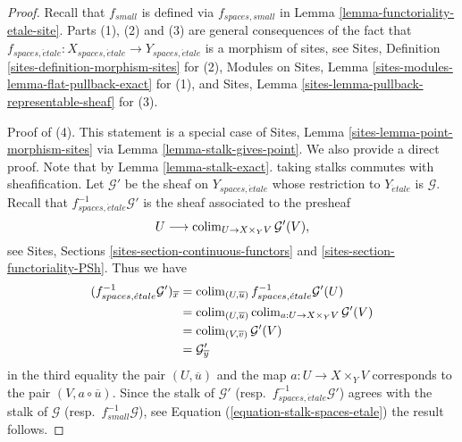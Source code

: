 \begin{proof}
Recall that $f_{small}$ is defined via $f_{spaces, small}$ in
Lemma \ref{lemma-functoriality-etale-site}.
Parts (1), (2) and (3) are general consequences of the fact that
$f_{spaces, \acute{e}tale} :
X_{spaces, \acute{e}tale}
\to
Y_{spaces, \acute{e}tale}$
is a morphism of sites, see
Sites, Definition \ref{sites-definition-morphism-sites}
for (2),
Modules on Sites, Lemma \ref{sites-modules-lemma-flat-pullback-exact}
for (1), and
Sites, Lemma \ref{sites-lemma-pullback-representable-sheaf}
for (3).

\medskip\noindent
Proof of (4). This statement is a special case of
Sites, Lemma \ref{sites-lemma-point-morphism-sites}
via
Lemma \ref{lemma-stalk-gives-point}.
We also provide a direct proof. Note that by
Lemma \ref{lemma-stalk-exact}.
taking stalks commutes with sheafification.
Let $\mathcal{G}'$ be the sheaf on $Y_{spaces, \acute{e}tale}$ whose restriction
to $Y_{\acute{e}tale}$ is $\mathcal{G}$.
Recall that $f_{spaces, \acute{e}tale}^{-1}\mathcal{G}'$ is the sheaf
associated to the presheaf
$$
U \longrightarrow \mathop{\rm colim}\nolimits_{U \to X \times_Y V} \mathcal{G}'(V),
$$
see
Sites, Sections \ref{sites-section-continuous-functors} and
\ref{sites-section-functoriality-PSh}.
Thus we have
\begin{align*}
(f_{spaces, \acute{e}tale}^{-1}\mathcal{G}')_{\overline{x}}
& =
\mathop{\rm colim}\nolimits_{(U, \overline{u})} f_{spaces, \acute{e}tale}^{-1}\mathcal{G}'(U)
\\
& = \mathop{\rm colim}\nolimits_{(U, \overline{u})}
\mathop{\rm colim}\nolimits_{a : U \to X \times_Y V} \mathcal{G}'(V) \\
& = \mathop{\rm colim}\nolimits_{(V, \overline{v})} \mathcal{G}'(V) \\
& = \mathcal{G}'_{\overline{y}}
\end{align*}
in the third equality the pair $(U, \overline{u})$ and the map
$a : U \to X \times_Y V$ corresponds to the pair $(V, a \circ \overline{u})$.
Since the stalk of $\mathcal{G}'$
(resp.\ $f_{spaces, \acute{e}tale}^{-1}\mathcal{G}'$)
agrees with the stalk of $\mathcal{G}$ (resp.\ $f_{small}^{-1}\mathcal{G}$),
see
Equation (\ref{equation-stalk-spaces-etale})
the result follows.
\end{proof}

